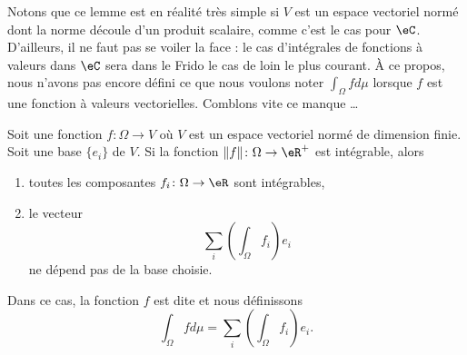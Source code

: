Notons que ce lemme est en réalité très simple si \( V\) est un espace vectoriel normé dont la norme découle d'un produit scalaire, comme c'est le cas pour \( \eC\). D'ailleurs, il ne faut pas se voiler la face : le cas d'intégrales de fonctions à valeurs dans \( \eC\) sera dans le Frido le cas de loin le plus courant. À ce propos, nous n'avons pas encore défini ce que nous voulons noter \( \int_{\Omega}fd\mu\) lorsque \( f\) est une fonction à valeurs vectorielles. Comblons vite ce manque \ldots

\begin{propositionDef}       \label{PROPooOFSMooLhqOsc}
    Soit une fonction \( f\colon \Omega\to V\) où \( V\) est un espace vectoriel normé de dimension finie. Soit une base \( \{ e_i \}\) de \( V\).  Si la fonction \( \| f \|\colon \Omega\to \eR^+\) est intégrable, alors
    \begin{enumerate}
        \item
            toutes les composantes \( f_i\colon \Omega\to \eR\) sont intégrables,
        \item
            le vecteur
            \begin{equation}        \label{EQooQCKMooZCbybq}
                \sum_i(\int_{\Omega}f_i) e_i
            \end{equation}
            ne dépend pas de la base choisie.
    \end{enumerate}
    Dans ce cas, la fonction \( f\) est dite  et nous définissons
    \begin{equation}
        \int_{\Omega}fd\mu=\sum_i(\int_{\Omega}f_i) e_i.
    \end{equation}
\end{propositionDef}

